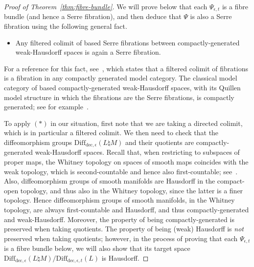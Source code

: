 \documentclass[10pt,a4paper]{amsart}
\numberwithin{equation}{section}
\newcommand{\rdec}{\mathrm{dec}}
\newcommand{\diffdece}{\ensuremath{\mathrm{Diff}_{\rdec,\epsilon}}}
\newcommand{\diffdecet}{\ensuremath{\mathrm{Diff}_{\rdec,\epsilon,t}}}
\newcommand*{\MK}{\mkern 2mu}
\theoremstyle{definition}
\theoremstyle{remark}
\begin{document}
\begin{proof}[Proof of Theorem~\ref{thm:fibre-bundle}]
We will prove below that each $\Psi_{\epsilon,t}$ is a fibre bundle (and hence a Serre fibration), and then deduce that $\Psi$ is also a Serre fibration using the following general fact.
\begin{itemize}
\item[$(*)$] Any filtered colimit of based Serre fibrations between compactly-generated weak-Hausdorff spaces is again a Serre fibration.
\end{itemize}
For a reference for this fact, see~\cite[Prop.~1.2.3.5$\MK$(1)]{ToenVezzosi}, which states that a filtered colimit of fibrations is a fibration in any compactly generated model category. The classical model category of based compactly-generated weak-Hausdorff spaces, with its Quillen model structure in which the fibrations are the Serre fibrations, is compactly generated; see for example~\cite[Prop.~6.3]{MMSS}.

To apply $(*)$ in our situation, first note that we are taking a directed colimit, which is in particular a filtered colimit. We then need to check that the diffeomorphism groups $\diffdece(L \natural M)$ and their quotients are compactly-generated weak-Hausdorff spaces. Recall that, when restricting to subspaces of proper maps, the Whitney topology on spaces of smooth maps coincides with the weak topology, which is second-countable and hence also first-countable; see~\cite[Chap.~2.1]{Hirsch1976Differentialtopology}. Also, diffeomorphism groups of smooth manifolds are Hausdorff in the compact-open topology, and thus also in the Whitney topology, since the latter is a finer topology. Hence diffeomorphism groups of smooth manifolds, in the Whitney topology, are always first-countable and Hausdorff, and thus compactly-generated and weak-Hausdorff. Moreover, the property of being compactly-generated is preserved when taking quotients. The property of being (weak) Hausdorff is \emph{not} preserved when taking quotients; however, in the process of proving that each $\Psi_{\epsilon,t}$ is a fibre bundle below, we will also show that its target space $\diffdece(L\natural M) / \diffdecet(L)$ is Hausdorff.


\end{proof}
\end{document}
